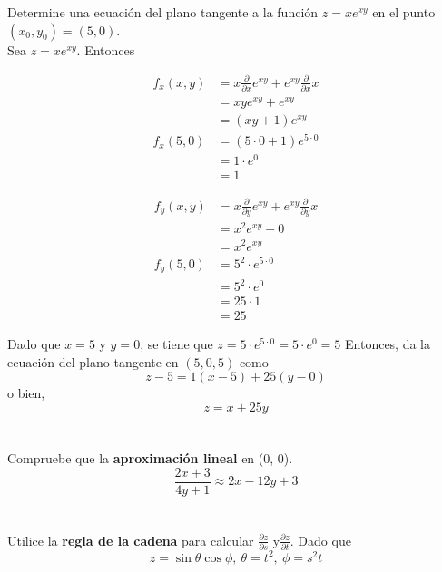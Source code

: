 \documentclass[12pt]{article}
\begin{document}
Determine una ecuación del plano tangente a la función $z = xe^{xy}$ en el punto $(x_0, y_0) = (5, 0)$. \\

Sea $z = xe^{xy}$. Entonces

\begin{align*}
  f_x(x,y)
  &= x\frac{\partial}{\partial x}e^{xy} + e^{xy}\frac{\partial}{\partial x}x \\
  &= xye^{xy} + e^{xy} \\
  &= (xy+1)e^{xy} \\
  f_x(5,0)
  &= (5\cdot 0 + 1) e^{5\cdot 0} \\
  &= 1 \cdot e^0 \\
  &= 1
\end{align*}

\begin{align*}
  f_y(x,y)
  &= x\frac{\partial}{\partial y}e^{xy} + e^{xy}\frac{\partial}{\partial y}x \\
  &= x^2e^{xy}+0 \\
  &= x^2e^{xy} \\
  f_y(5,0)
  &= 5^2\cdot e^{5\cdot 0} \\
  &= 5^2\cdot e^0 \\
  &= 25 \cdot 1 \\
  &= 25
\end{align*}

Dado que $x=5$ y $y=0$, se tiene que $z=5\cdot e^{5\cdot 0} = 5\cdot e^0=5$
Entonces, da la ecuación del plano tangente en $(5,0,5)$ como
$$z-5=1(x-5)+25(y-0)$$
o bien,
$$z=x+25y$$

\section{}

Compruebe que la \textbf{aproximación lineal} en (0, 0).
$$\frac{2x+3}{4y +1} \approx 2x - 12y + 3$$

\section{}

Utilice la \textbf{regla de la cadena} para calcular $\frac{\partial z}{\partial s}$ y$\frac{\partial z}{\partial t}$. Dado que
$$z = \sin{\theta}\cos{\phi}, ~ \theta = t^2, ~ \phi = s^2t$$
\end{document}
